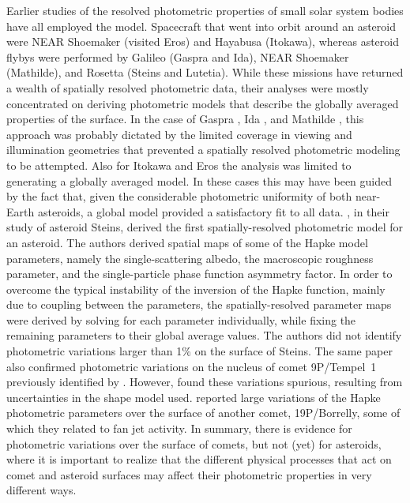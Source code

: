 \documentclass[3p,authoryear]{elsarticle}
\begin{document}
Earlier studies of the resolved photometric properties of small solar system bodies have all employed the \citet{H81,H02} model. Spacecraft that went into orbit around an asteroid were NEAR Shoemaker (visited Eros) and Hayabusa (Itokawa), whereas asteroid flybys were performed by Galileo (Gaspra and Ida), NEAR Shoemaker (Mathilde), and Rosetta (Steins and Lutetia). While these missions have returned a wealth of spatially resolved photometric data, their analyses were mostly concentrated on deriving photometric models that describe the globally averaged properties of the surface. In the case of Gaspra \citep{H94}, Ida \citep{H96}, and Mathilde \citep{C99}, this approach was probably dictated by the limited coverage in viewing and illumination geometries that prevented a spatially resolved photometric modeling to be attempted. Also for Itokawa \citep{K08} and Eros \citep{C99,C02} the analysis was limited to generating a globally averaged model. In these cases this may have been guided by the fact that, given the considerable photometric uniformity of both near-Earth asteroids, a global model provided a satisfactory fit to all data. \citet{Sp12}, in their study of asteroid Steins, derived the first spatially-resolved photometric model for an asteroid. The authors derived spatial maps of some of the Hapke model parameters, namely the single-scattering albedo, the macroscopic roughness parameter, and the single-particle phase function asymmetry factor. In order to overcome the typical instability of the inversion of the Hapke function, mainly due to coupling between the parameters, the spatially-resolved parameter maps were derived by solving for each parameter individually, while fixing the remaining parameters to their global average values. The authors did not identify photometric variations larger than 1\% on the surface of Steins. The same paper also confirmed photometric variations on the nucleus of comet 9P/Tempel~1 previously identified by \citet{L07}. However, \citet{Li12} found these variations spurious, resulting from uncertainties in the shape model used. \citet{Li07} reported large variations of the Hapke photometric parameters over the surface of another comet, 19P/Borrelly, some of which they related to fan jet activity. In summary, there is evidence for photometric variations over the surface of comets, but not (yet) for asteroids, where it is important to realize that the different physical processes that act on comet and asteroid surfaces may affect their photometric properties in very different ways.
\end{document}
